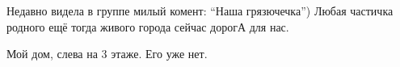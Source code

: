 
 
 
 
 

\qqSecCmt


Недавно видела в группе милый комент: \enquote{Наша грязючечка}) Любая частичка
родного ещё тогда живого города сейчас дорогА для нас.


Мой дом, слева на 3 этаже. Его уже нет.
